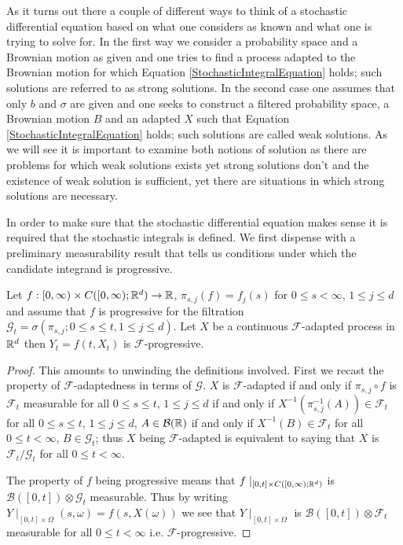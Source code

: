 As it turns out there a couple of different ways to think of a stochastic differential equation based on what one considers as known and what one is trying to solve for.  In the first way we consider a probability space and a Brownian motion as given and one tries to find a process adapted to the Brownian motion for which Equation \eqref{StochasticIntegralEquation} holds; such solutions are referred to as strong solutions.  In the second case one assumes that only $b$ and $\sigma$ are given and one seeks to construct a filtered probability space, a Brownian motion $B$ and an adapted $X$ such that Equation \eqref{StochasticIntegralEquation} holds; such solutions are called weak solutions.  As we will see it is important to examine both notions of solution as there are problems for which weak solutions exists yet strong solutions don't and the existence of weak solution is sufficient, yet there are situations in which strong solutions are necessary.

In order to make sure that the stochastic differential equation makes sense it is required that the stochastic integrals is defined.  We first dispense with a preliminary measurability result that tells us conditions under which the candidate integrand is progressive.
\begin{lem}Let $f : [0,\infty) \times C([0,\infty); \mathbb{R}^d) \to \mathbb{R}$, $\pi_{s, j} (f) = f_j(s)$ for $0 \leq s < \infty$, $1 \leq j \leq d$ and assume that $f$ is progressive for the filtration $\mathcal{G}_t = \sigma(\pi_{s,j} ; 0 \leq s \leq t, 1 \leq j \leq d)$.  Let $X$ be a continuous $\mathcal{F}$-adapted process in $\mathbb{R}^d$ then $Y_t = f(t,X_t)$ is $\mathcal{F}$-progressive.
\end{lem}
\begin{proof}
This amounts to unwinding the definitions involved.  First we recast the property of $\mathcal{F}$-adaptedness in terms of $\mathcal{G}$.  $X$ is $\mathcal{F}$-adapted if and only if $\pi_{s,j} \circ f$ is $\mathcal{F}_t$ measurable for all $0 \leq s \leq t$, $1\leq j \leq d$ if and only if $X^{-1}(\pi_{s,j}^{-1}(A)) \in \mathcal{F}_t$ for all $0 \leq s \leq t$, $1\leq j \leq d$,  $A \in \mathcal{B}(\mathbb{R})$ if and only if $X^{-1}(B) \in \mathcal{F}_t$ for all $0 \leq t < \infty$, $B \in \mathcal{G}_t$;  thus $X$ being $\mathcal{F}$-adapted is equivalent to saying that $X$ is $\mathcal{F}_t/\mathcal{G}_t$ for all $0 \leq t < \infty$.

The property of $f$ being progressive means that $f \mid_{[0,t] \times  C([0,\infty); \mathbb{R}^d)}$ is $\mathcal{B}([0,t]) \otimes \mathcal{G}_t$ measurable.  Thus by writing $Y \mid_{[0,t] \times \Omega} (s,\omega) = f(s, X(\omega))$ we see that $Y \mid_{[0,t] \times \Omega}$ is $\mathcal{B}([0,t]) \otimes \mathcal{F}_t$ measurable for all $0 \leq t < \infty$ i.e. $\mathcal{F}$-progressive.
\end{proof}

